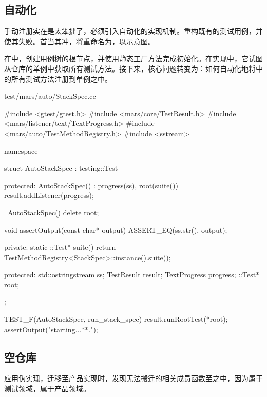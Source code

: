 \begin{content}

\subsection{自动化}

手动注册实在是太笨拙了，必须引入自动化的实现机制。重构既有的测试用例，并使其失败。首当其冲，将重命名为，以示意图。

在中，创建用例树的根节点，并使用静态工厂方法完成初始化。在实现中，它试图从仓库的单例中获取所有测试方法。接下来，核心问题转变为：如何自动化地将中的所有测试方法注册到单例之中。

\begin{nodiff}{test/mars/auto/StackSpec.cc}
 \begin{c++}
#include <gtest/gtest.h>
#include <mars/core/TestResult.h>
#include <mars/listener/text/TextProgress.h>
#include <mars/auto/TestMethodRegistry.h>
#include <sstream>

namespace {
  struct AutoStackSpec : testing::Test {
  protected:
    AutoStackSpec() : progress(ss), root(suite()) {
      result.addListener(progress);
    }

    ~AutoStackSpec() {
      delete root;
    }

    void assertOutput(const char* output) {
      ASSERT_EQ(ss.str(), output);
    }

  private:
    static ::Test* suite() {
      return TestMethodRegistry<StackSpec>::instance().suite();
    }

  protected:
    std::ostringstream ss;
    TestResult result;
    TextProgress progress;
    ::Test* root;
  };
}

TEST_F(AutoStackSpec, run_stack_spec) {
  result.runRootTest(*root);
  assertOutput("starting...\n***\nend.\n");
}
 \end{c++}
\end{nodiff}

\subsection{空仓库}

应用伪实现，迁移至产品实现时，发现无法搬迁的相关成员函数至之中，因为属于测试领域，属于产品领域。


\end{content}
